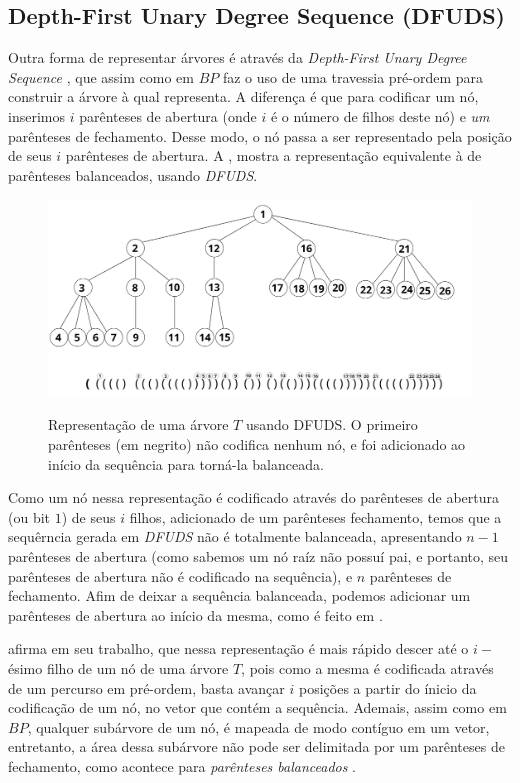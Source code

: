 \subsection{Depth-First Unary Degree Sequence (DFUDS)}
Outra forma de representar árvores é através da \textit{Depth-First Unary Degree Sequence} \citep{article-dfuds}, que assim como em $BP$ faz o uso de uma travessia pré-ordem para construir a árvore à qual representa.
A diferença é que  para codificar um nó, inserimos $i$ parênteses de abertura (onde $i$ é o número de filhos deste nó) e \textit{um} parênteses de fechamento.  Desse modo, o nó passa a ser representado pela posição de seus $i$ parênteses de abertura. A , mostra a representação equivalente à de parênteses balanceados, usando \textit{DFUDS}.
\begin{figure}[!ht]
    \centering
      \caption[Representação de árvores com Sequência de Grau Unário]{Representação de uma árvore $T$ usando DFUDS. O primeiro parênteses (em negrito) não codifica nenhum nó, e foi adicionado ao início da sequência  para torná-la balanceada.}
      \includegraphics[width=\columnwidth]{images/dfuds.png}
      \label{fig:dfuds-representation}
\end{figure}

Como um nó nessa representação é codificado através do parênteses de abertura (ou bit $1$) de seus $i$ filhos, adicionado de um parênteses fechamento, temos que a sequêrncia gerada em \textit{DFUDS} não é totalmente balanceada, apresentando $n-1$ parênteses de abertura (como sabemos um nó raíz não possuí pai, e portanto, seu parênteses de abertura não é codificado na sequência), e $n$ parênteses de fechamento.  Afim de deixar a sequência balanceada, podemos adicionar um parênteses de abertura ao início da mesma, como é feito em \citet{paper-succint-trees-in-practice}.

\citet{book-compact-data-structures} afirma em seu trabalho, que nessa representação é mais  rápido descer até o $i-$ésimo filho de um nó de uma árvore $T$, pois como a mesma é codificada através de um percurso em pré-ordem, basta avançar  $i$ posições a partir do ínicio da codificação de um nó, no vetor que contém a sequência. Ademais, assim como em $BP$, qualquer subárvore de um nó, é mapeada de modo contíguo em um vetor, entretanto, a área dessa subárvore não pode ser delimitada por um parênteses de fechamento, como acontece para \textit{parênteses balanceados} \citep{book-compact-data-structures}.


